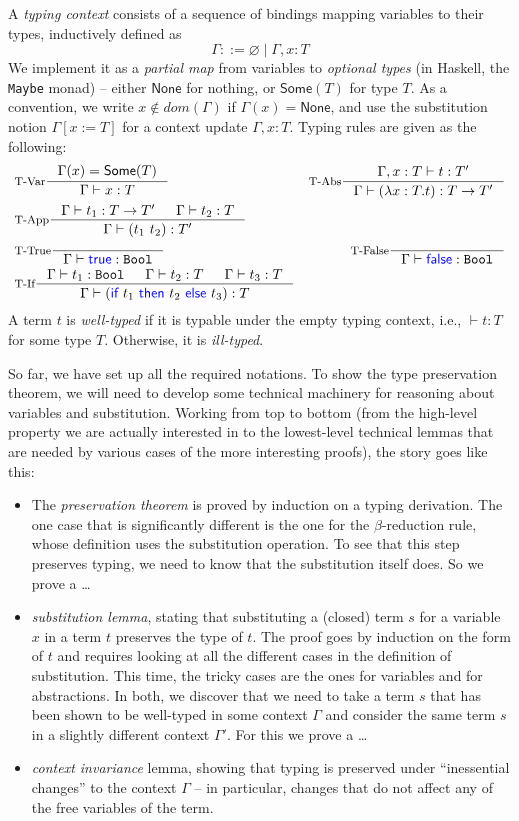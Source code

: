 \documentclass[11pt]{article}
\let\t\texttt
\let\emptyset\varnothing
\let\to\rightarrow
\newcommand{\Bool}{\t{Bool}}
\newcommand{\Some}[1]{\textsf{Some}(#1)}
\newcommand{\None}{\textsf{None}}
\newcommand{\kword}[1]{{\color{blue} \textsf{#1}}}
\newcommand{\True}{\kword{true}}
\newcommand{\False}{\kword{false}}
\newcommand{\If}{\kword{if}}
\newcommand{\Then}{\kword{then}}
\newcommand{\Else}{\kword{else}}
\begin{document}
A \emph{typing context} consists of a sequence of bindings mapping variables to their types, inductively defined as
$$\Gamma ::= \emptyset \mid \Gamma,x:T$$
We implement it as a \emph{partial map} from variables to \emph{optional types} (in Haskell, the \t{Maybe} monad) -- either $\None$ for nothing, or $\Some{T}$ for type $T$.
As a convention, we write $x \not\in dom(\Gamma)$ if $\Gamma(x)=\None$, and use the substitution notion $\Gamma[x:=T]$ for a context update $\Gamma,x:T$.
Typing rules are given as the following:
\begin{align*}
    & \inference[T-Var]{\Gamma(x)=\Some{T}}{\Gamma \vdash x:T}
    & \inference[T-Abs]{\Gamma,x:T \vdash t:T'}{\Gamma \vdash (\lambda x:T.t):T \to T'} \\
    & \inference[T-App]{\Gamma \vdash t_1:T \to T' & \Gamma \vdash t_2:T}{\Gamma \vdash (t_1~t_2):T'} \\
    & \inference[T-True]{}{\Gamma \vdash \True:\Bool}
    & \inference[T-False]{}{\Gamma \vdash \False:\Bool} \\
    & \inference[T-If]{\Gamma \vdash t_1:\Bool & \Gamma \vdash t_2:T & \Gamma \vdash t_3:T}{\Gamma \vdash (\If~t_1~\Then~t_2~\Else~t_3):T}
\end{align*}
A term $t$ is \emph{well-typed} if it is typable under the empty typing context, i.e., $\vdash t:T$ for some type $T$.
Otherwise, it is \emph{ill-typed}.

So far, we have set up all the required notations.
To show the type preservation theorem, we will need to develop some technical machinery for reasoning about variables
and substitution.
Working from top to bottom (from the high-level property we are actually interested in to the lowest-level technical lemmas that are needed by various cases of the more interesting proofs), the story goes like this:
\begin{itemize}
    \item The \emph{preservation theorem} is proved by induction on a typing derivation.
    The one case that is significantly different is the one for the $\beta$-reduction rule, whose definition uses the substitution operation. 
    To see that this step preserves typing, we need to know that the substitution itself does. So we prove a \ldots
    \item \emph{substitution lemma}, stating that substituting a (closed) term $s$ for a variable $x$ in a term $t$ preserves the type of $t$.
    The proof goes by induction on the form of $t$ and requires looking at all the different cases in the definition of substitution.
    This time, the tricky cases are the ones for variables and for abstractions. 
    In both, we discover that we need to take a term $s$ that has been shown to be well-typed in some context $\Gamma$ and consider the same term $s$ in a slightly different context $\Gamma'$.  For this we prove a \ldots
    \item \emph{context invariance} lemma, showing that typing is preserved under ``inessential changes'' to the context $\Gamma$ -- in particular, changes that do not affect any of the free variables of the term.
\end{itemize}
\end{document}
